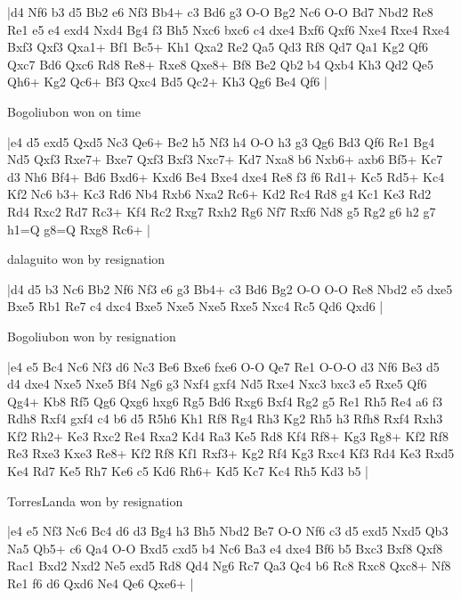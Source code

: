 \makegametitle
|d4 Nf6 b3 d5 Bb2 e6 Nf3 Bb4+ c3 Bd6 g3 O-O Bg2 Nc6 O-O Bd7 Nbd2 Re8 Re1 e5 e4 exd4 Nxd4 Bg4 f3 Bh5 Nxc6 bxc6 c4 dxe4 Bxf6 Qxf6 Nxe4 Rxe4 Rxe4 Bxf3 Qxf3 Qxa1+ Bf1 Bc5+ Kh1 Qxa2 Re2 Qa5 Qd3 Rf8 Qd7 Qa1 Kg2 Qf6 Qxc7 Bd6 Qxc6 Rd8 Re8+ Rxe8 Qxe8+ Bf8 Be2 Qb2 b4 Qxb4 Kh3 Qd2 Qe5 Qh6+ Kg2 Qc6+ Bf3 Qxc4 Bd5 Qc2+ Kh3 Qg6 Be4 Qf6  |

\showboard

Bogoliubon won on time

\makegametitle
|e4 d5 exd5 Qxd5 Nc3 Qe6+ Be2 h5 Nf3 h4 O-O h3 g3 Qg6 Bd3 Qf6 Re1 Bg4 Nd5 Qxf3 Rxe7+ Bxe7 Qxf3 Bxf3 Nxc7+ Kd7 Nxa8 b6 Nxb6+ axb6 Bf5+ Kc7 d3 Nh6 Bf4+ Bd6 Bxd6+ Kxd6 Be4 Bxe4 dxe4 Re8 f3 f6 Rd1+ Kc5 Rd5+ Kc4 Kf2 Nc6 b3+ Kc3 Rd6 Nb4 Rxb6 Nxa2 Rc6+ Kd2 Rc4 Rd8 g4 Kc1 Ke3 Rd2 Rd4 Rxc2 Rd7 Rc3+ Kf4 Rc2 Rxg7 Rxh2 Rg6 Nf7 Rxf6 Nd8 g5 Rg2 g6 h2 g7 h1=Q g8=Q Rxg8 Rc6+  |

\showboard

dalaguito won by resignation

\makegametitle
|d4 d5 b3 Nc6 Bb2 Nf6 Nf3 e6 g3 Bb4+ c3 Bd6 Bg2 O-O O-O Re8 Nbd2 e5 dxe5 Bxe5 Rb1 Re7 c4 dxc4 Bxe5 Nxe5 Nxe5 Rxe5 Nxc4 Rc5 Qd6 Qxd6  |

\showboard

Bogoliubon won by resignation

\makegametitle
|e4 e5 Bc4 Nc6 Nf3 d6 Nc3 Be6 Bxe6 fxe6 O-O Qe7 Re1 O-O-O d3 Nf6 Be3 d5 d4 dxe4 Nxe5 Nxe5 Bf4 Ng6 g3 Nxf4 gxf4 Nd5 Rxe4 Nxc3 bxc3 e5 Rxe5 Qf6 Qg4+ Kb8 Rf5 Qg6 Qxg6 hxg6 Rg5 Bd6 Rxg6 Bxf4 Rg2 g5 Re1 Rh5 Re4 a6 f3 Rdh8 Rxf4 gxf4 c4 b6 d5 R5h6 Kh1 Rf8 Rg4 Rh3 Kg2 Rh5 h3 Rfh8 Rxf4 Rxh3 Kf2 Rh2+ Ke3 Rxc2 Re4 Rxa2 Kd4 Ra3 Ke5 Rd8 Kf4 Rf8+ Kg3 Rg8+ Kf2 Rf8 Re3 Rxe3 Kxe3 Re8+ Kf2 Rf8 Kf1 Rxf3+ Kg2 Rf4 Kg3 Rxc4 Kf3 Rd4 Ke3 Rxd5 Ke4 Rd7 Ke5 Rh7 Ke6 c5 Kd6 Rh6+ Kd5 Kc7 Kc4 Rh5 Kd3 b5  |

\showboard

TorresLanda won by resignation

\makegametitle
|e4 e5 Nf3 Nc6 Bc4 d6 d3 Bg4 h3 Bh5 Nbd2 Be7 O-O Nf6 c3 d5 exd5 Nxd5 Qb3 Na5 Qb5+ c6 Qa4 O-O Bxd5 cxd5 b4 Nc6 Ba3 e4 dxe4 Bf6 b5 Bxc3 Bxf8 Qxf8 Rac1 Bxd2 Nxd2 Ne5 exd5 Rd8 Qd4 Ng6 Rc7 Qa3 Qc4 b6 Rc8 Rxc8 Qxc8+ Nf8 Re1 f6 d6 Qxd6 Ne4 Qe6 Qxe6+  |

